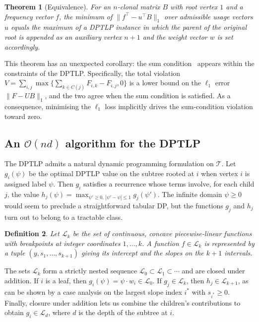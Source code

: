 \documentclass[11pt]{article}
\newtheorem{theorem}{Theorem}
\newtheorem{definition}[theorem]{Definition}
\begin{document}
\begin{theorem}[Equivalence]
For an $n$-clonal matrix $B$ with root vertex $1$ and a frequency vector $f$, the minimum of $\|f^\top - u^\top B\|_1$ over admissible usage vectors $u$ equals the maximum of a DPTLP instance in which the parent of the original root is appended as an auxiliary vertex $n+1$ and the weight vector $w$ is set accordingly.
\end{theorem}

This theorem has an unexpected corollary: the sum condition~\citep{elkebir2015reconstruction,popic2015lichee,malikic2015citup} appears within the constraints of the DPTLP. Specifically, the total violation $V=\sum_{i,j}\max\{\sum_{k\in C(j)} F_{i,k} - F_{i,j}, 0\}$ is a lower bound on the $\ell_1$ error $\|F - UB\|_1$, and the two agree when the sum condition is satisfied. As a consequence, minimising the $\ell_1$ loss implicitly drives the sum-condition violation toward zero.

\subsection{An $\mathcal{O}(nd)$ algorithm for the DPTLP}

The DPTLP admits a natural dynamic programming formulation on $\mathcal{T}$. Let $g_i(\psi)$ be the optimal DPTLP value on the subtree rooted at $i$ when vertex $i$ is assigned label $\psi$. Then $g_i$ satisfies a recurrence whose terms involve, for each child $j$, the value $h_j(\psi) = \max_{\psi'\geq 0,\,|\psi' - \psi|\leq 1} g_j(\psi')$. The infinite domain $\psi \geq 0$ would seem to preclude a straightforward tabular DP, but the functions $g_j$ and $h_j$ turn out to belong to a tractable class.

\begin{definition}
Let $\mathcal{L}_k$ be the set of continuous, concave piecewise-linear functions with breakpoints at integer coordinates $1,\ldots,k$. A function $f\in\mathcal{L}_k$ is represented by a tuple $(y, s_1,\ldots,s_{k+1})$ giving its intercept and the slopes on the $k+1$ intervals.
\end{definition}

The sets $\mathcal{L}_k$ form a strictly nested sequence $\mathcal{L}_0\subset\mathcal{L}_1\subset\cdots$ and are closed under addition. If $i$ is a leaf, then $g_i(\psi) = \psi \cdot w_i\in\mathcal{L}_0$. If $g_j\in\mathcal{L}_k$, then $h_j\in\mathcal{L}_{k+1}$, as can be shown by a case analysis on the largest slope index $i^*$ with $s_{i^*}\geq 0$. Finally, closure under addition lets us combine the children's contributions to obtain $g_i\in\mathcal{L}_d$, where $d$ is the depth of the subtree at $i$.
\end{document}
